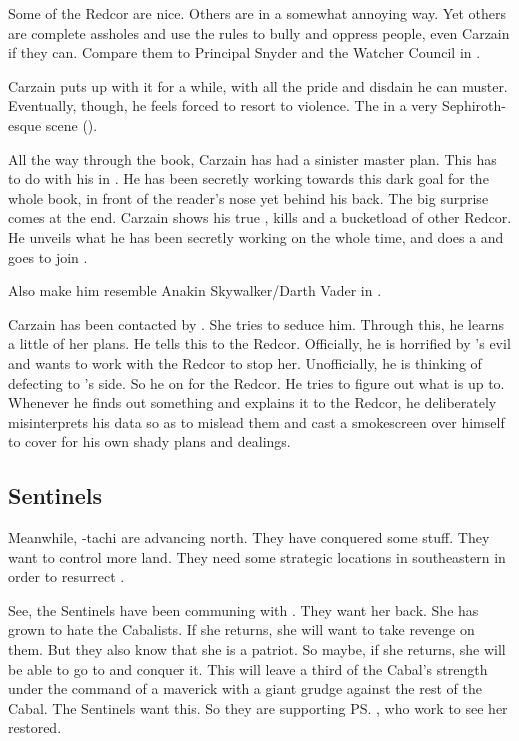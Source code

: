 Some of the Redcor are nice.
Others are  in a somewhat annoying way. 
Yet others are complete assholes and use the rules to bully and oppress people, even Carzain if they can. 
Compare them to Principal Snyder and the Watcher Council in \cite{TV:Buffy}. 

Carzain puts up with it for a while, with all the pride and disdain he can muster.
Eventually, though, he feels forced to resort to violence.
The  in a very Sephiroth-esque scene (\cite{VideoGame:FinalFantasyVII}). 

All the way through the book, Carzain has had a sinister master plan.
This has to do with his  in \TwilightAngelRememberEmph. 
He has been secretly working towards this dark goal for the whole book, in front of the reader's nose yet behind his back. 
The big surprise comes at the end. 
Carzain shows his true \colours, kills \Racel and a bucketload of other Redcor. 
He unveils what he has been secretly working on the whole time, and does a  and goes to join \Belzir. 

Also make him resemble Anakin Skywalker/Darth Vader in \cite{Movie:StarWars:III}. 

Carzain has been contacted by \Belzir. 
She tries to seduce him.
Through this, he learns a little of her plans. 
He tells this to the Redcor. 
Officially, he is horrified by \Belzir's evil and wants to work with the Redcor to stop her. 
Unofficially, he is thinking of defecting to \Belzir's side. 
So he  on \Belzir for the Redcor. 
He tries to figure out what \Belzir is up to.
Whenever he finds out something and explains it to the Redcor, he deliberately misinterprets his data so as to mislead them and cast a smokescreen over himself to cover for his own shady plans and dealings. 









\subsection{Sentinels}
Meanwhile, \Narkiza-tachi are advancing north. 
They have conquered some stuff. 
They want to control more land. 
They need some strategic locations in southeastern \Velcad{} in order to resurrect \Belzir. 

See, the Sentinels have been communing with \Belzir. 
They want her back. 
She has grown to hate the Cabalists.
If she returns, she will want to take revenge on them. 
But they also know that she is a \Mystraacht{} patriot. 
So maybe, if she returns, she will be able to go to \Mystraacht{} and conquer it. 
This will leave a third of the Cabal's strength under the command of a maverick with a giant grudge against the rest of the Cabal. 
The Sentinels want this. 
So they are supporting \ps{\Belzir} , who work to see her restored. 

